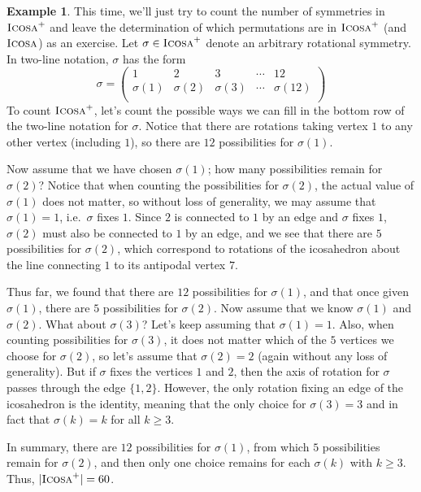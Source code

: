 \documentclass[11pt]{amsart}
\theoremstyle{plain}
\theoremstyle{definition}
\newtheorem{example}{Example}
\theoremstyle{remark}
\newcommand{\symicosa}{\textsc{Icosa}}
\newcommand{\rsymicosa}{\textsc{Icosa}^+}
\begin{document}
\begin{example}
This time, we'll just try to count the number of symmetries in $\rsymicosa$ and leave the  determination of which permutations are in $\rsymicosa$ (and $\symicosa$) as an exercise. Let $\sigma\in \rsymicosa$ denote an arbitrary rotational symmetry. In two-line notation, $\sigma$ has the form
\[\sigma = \begin{pmatrix}
1 & 2 & 3 & \cdots & 12\\
\sigma(1) & \sigma(2) & \sigma(3) & \cdots & \sigma(12)\\
\end{pmatrix}\]
To count $\rsymicosa$, let's count the possible ways we can fill in the bottom row of the two-line notation for $\sigma$. Notice that there are rotations taking vertex $1$ to any other vertex (including $1$), so there are $12$ possibilities for $\sigma(1)$. 

Now assume that we have chosen $\sigma(1)$; how many possibilities remain for $\sigma(2)$?  Notice that when counting the possibilities for $\sigma(2)$, the actual value of $\sigma(1)$ does not matter, so without loss of generality, we may assume that $\sigma(1)=1$, i.e.~$\sigma$ fixes $1$. Since $2$ is connected to $1$ by an edge and $\sigma$ fixes $1$, $\sigma(2)$ must also be connected to $1$ by an edge, and we see that there are $5$ possibilities for $\sigma(2)$, which  correspond to rotations of the icosahedron about the line connecting $1$ to its antipodal vertex $7$. 

Thus far, we found that there are $12$ possibilities for $\sigma(1)$, and that once given $\sigma(1)$, there are $5$ possibilities for $\sigma(2)$. Now assume that we know $\sigma(1)$ and $\sigma(2)$. What about $\sigma(3)$? Let's keep assuming that $\sigma(1)=1$. Also, when counting possibilities for $\sigma(3)$, it does not matter which of the $5$ vertices we choose for $\sigma(2)$, so let's assume that $\sigma(2) = 2$  (again without any loss of generality). But if $\sigma$ fixes the vertices $1$ and $2$, then the axis of rotation for $\sigma$ passes through the edge $\{1,2\}$. However, the only rotation fixing an edge of the icosahedron is the identity, meaning that the only choice for $\sigma(3) = 3$ and in fact that $\sigma(k) = k$ for all $k\ge 3$. 

In summary, there are $12$ possibilities for $\sigma(1)$, from which $5$ possibilities remain for $\sigma(2)$, and then only one choice remains for each $\sigma(k)$ with $k\ge 3$. Thus, $|\rsymicosa| = 60$.
\end{example}
\end{document}
